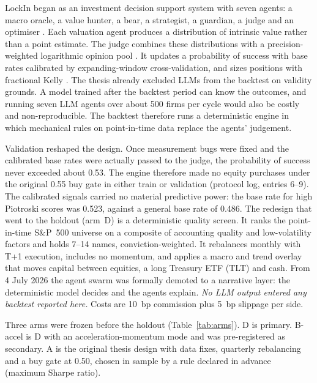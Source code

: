 \documentclass[11pt]{article}
\begin{document}
LockIn began as an investment decision support system with seven agents: a macro oracle, a value hunter, a bear, a strategist, a guardian, a judge and an optimiser \citep{Dominguez2026TFM}. Each valuation agent produces a distribution of intrinsic value rather than a point estimate. The judge combines these distributions with a precision-weighted logarithmic opinion pool \citep{GenestZidek1986}. It updates a probability of success with base rates calibrated by expanding-window cross-validation, and sizes positions with fractional Kelly \citep{Kelly1956}. The thesis already excluded LLMs from the backtest on validity grounds. A model trained after the backtest period can know the outcomes, and running seven LLM agents over about 500 firms per cycle would also be costly and non-reproducible. The backtest therefore runs a deterministic engine in which mechanical rules on point-in-time data replace the agents' judgement.

Validation reshaped the design. Once measurement bugs were fixed and the calibrated base rates were actually passed to the judge, the probability of success never exceeded about 0.53. The engine therefore made no equity purchases under the original 0.55 buy gate in either train or validation (protocol log, entries 6--9). The calibrated signals carried no material predictive power: the base rate for high Piotroski scores was 0.523, against a general base rate of 0.486. The redesign that went to the holdout (arm~D) is a deterministic quality screen. It ranks the point-in-time S\&P~500 universe on a composite of accounting quality and low-volatility factors and holds 7--14 names, conviction-weighted. It rebalances monthly with T+1 execution, includes no momentum, and applies a macro and trend overlay that moves capital between equities, a long Treasury ETF (TLT) and cash. From 4 July 2026 the agent swarm was formally demoted to a narrative layer: the deterministic model decides and the agents explain. \emph{No LLM output entered any backtest reported here.} Costs are 10~bp commission plus 5~bp slippage per side.

Three arms were frozen before the holdout (Table~\ref{tab:arms}). D is primary. B-accel is D with an acceleration-momentum mode and was pre-registered as secondary. A is the original thesis design with data fixes, quarterly rebalancing and a buy gate at 0.50, chosen in sample by a rule declared in advance (maximum Sharpe ratio).
\end{document}
